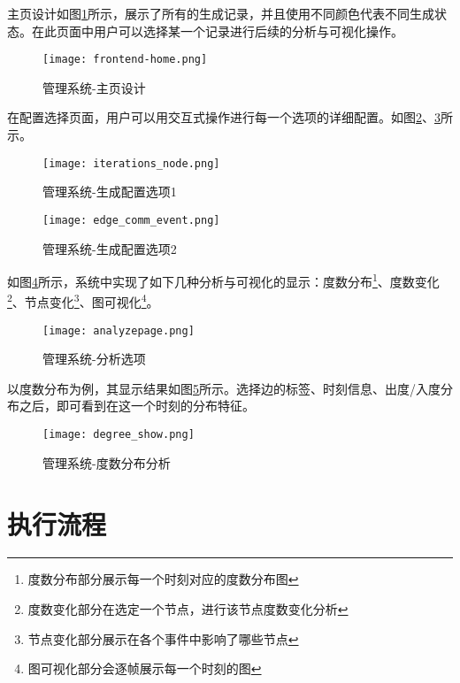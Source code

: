 主页设计如图\ref{fig:frontend-home}所示，展示了所有的生成记录，并且使用不同颜色代表不同生成状态。在此页面中用户可以选择某一个记录进行后续的分析与可视化操作。

\begin{figure}[H]
  \centering
  \texttt{[image: frontend-home.png]}
  \caption{管理系统-主页设计}
  \label{fig:frontend-home}
\end{figure}

在配置选择页面，用户可以用交互式操作进行每一个选项的详细配置。如图\ref{fig:iterations_node}、\ref{fig:edge_comm_event}所示。

\begin{figure}[H]
  \centering
  \texttt{[image: iterations\_node.png]}
  \caption{管理系统-生成配置选项1}
  \label{fig:iterations_node}
\end{figure}

\begin{figure}[H]
  \centering
  \texttt{[image: edge\_comm\_event.png]}
  \caption{管理系统-生成配置选项2}
  \label{fig:edge_comm_event}
\end{figure}

如图\ref{fig:analyzepage}所示，系统中实现了如下几种分析与可视化的显示：度数分布\footnote{度数分布部分展示每一个时刻对应的度数分布图}、度数变化\footnote{度数变化部分在选定一个节点，进行该节点度数变化分析}、节点变化\footnote{节点变化部分展示在各个事件中影响了哪些节点}、图可视化\footnote{图可视化部分会逐帧展示每一个时刻的图}。

\begin{figure}[H]
  \centering
  \texttt{[image: analyzepage.png]}
  \caption{管理系统-分析选项}
  \label{fig:analyzepage}
\end{figure}

以度数分布为例，其显示结果如图\ref{fig:degree_show}所示。选择边的标签、时刻信息、出度/入度分布之后，即可看到在这一个时刻的分布特征。

\begin{figure}[H]
  \centering
  \texttt{[image: degree\_show.png]}
  \caption{管理系统-度数分布分析}
  \label{fig:degree_show}
\end{figure}

\section{执行流程}


